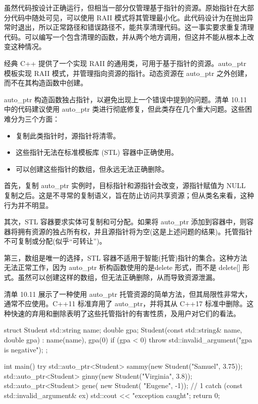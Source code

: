 
虽然代码按设计正确运行，但相当一部分仅管理基于指针的资源。原始指针在大部分代码中随处可见，可以使用 RAII 模式将其管理最小化。此代码设计为在抛出异常时退出，所以正常路径和错误路径不，能共享清理代码。这一事实要求重复清理代码。可以编写一个包含清理的函数，并从两个地方调用，但这并不能从根本上改变这种情况。

经典 C++ 提供了一个实现 RAII 的通用类，可用于基于指针的资源。auto\_ptr 模板实现 RAII 模式，并管理指向资源的指针。动态资源在 auto\_ptr 之外创建，而不在其构造函数中创建。

auto\_ptr 构造函数独占指针，以避免出现上一个错误中提到的问题。清单 10.11 中的代码建议使用 auto\_ptr 类进行彻底修复，但此类存在几个重大问题。这些困难分为三个方面：

\begin{itemize}
\item
复制此类指针时，源指针将清零。

\item
这些指针无法在标准模板库 (STL) 容器中正确使用。

\item
可以创建这些指针的数组，但永远无法正确删除。
\end{itemize}

首先，复制 auto\_ptr 实例时，目标指针和源指针会改变，源指针赋值为 NULL 复制之后。这是不寻常的复制语义，旨在防止访问共享资源；但从类名来看，这种行为并不明显。

其次，STL 容器要求实体可复制和可分配。如果将 auto\_ptr 添加到容器中，则容器将拥有资源的独占所有权，并且源指针将为空(这是上述问题的结果)。托管指针不可复制或分配(似乎“可转让”)。

第三，数组是唯一的选择，STL 容器不适用于智能(托管)指针的集合。这种方法无法正常工作，因为 auto\_ptr 析构函数使用的是delete 形式，而不是 delete[] 形式。虽然可以创建这样的数组，但无法正确删除，从而导致资源泄漏。

清单 10.11 展示了一种使用 auto\_ptr 托管资源的简单方法，但其局限性非常大，通常不应使用。C++11 标准弃用了 auto\_ptr，并将其从 C++17 标准中删除。这种快速的弃用和删除表明了这些托管指针的有害性质，及用户对它们的看法。


\begin{cpp}
struct Student {
  std::string name;
  double gpa;
  Student(const std::string& name, double gpa) : name(name), gpa(0) {
    if (gpa < 0)
      throw std::invalid_argument("gpa is negative");
  }
};

int main() {
  try {
    std::auto_ptr<Student> sammy(new Student("Samuel", 3.75));
    std::auto_ptr<Student> ginny(new Student("Virginia", 3.8));
    std::auto_ptr<Student> gene(
      new Student( "Eugene", -1)); // 1
  } catch (const std::invalid_argument& ex) {
    std::cout << "exception caught\n";
  }
  return 0;
}
\end{cpp}

